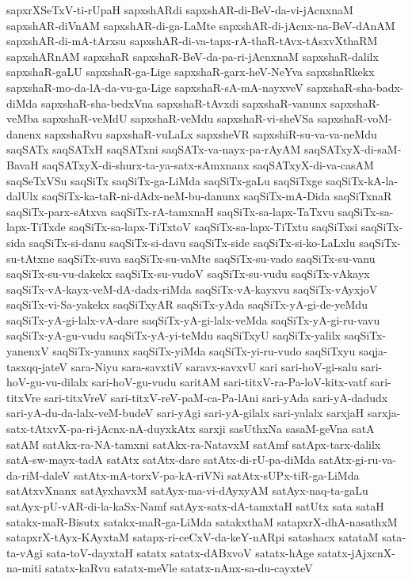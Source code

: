 {sapxrXSeTxV-ti-rUpaH
sapxshARdi
sapxshAR-di-BeV-da-vi-jAcnxnaM
sapxshAR-diVnAM
sapxshAR-di-ga-LaMte
sapxshAR-di-jAcnx-na-BeV-dAnAM
sapxshAR-di-mA-tArxsu
sapxshAR-di-va-tapx-rA-thaR-tAvx-tAsxvXthaRM
sapxshARnAM
sapxshaR
sapxshaR-BeV-da-pa-ri-jAcnxnaM
sapxshaR-dalilx
sapxshaR-gaLU
sapxshaR-ga-Lige
sapxshaR-garx-heV-NeYva
sapxshaRkekx
sapxshaR-mo-da-lA-da-vu-ga-Lige
sapxshaR-sA-mA-nayxveV
sapxshaR-sha-badx-diMda
sapxshaR-sha-bedxVna
sapxshaR-tAvxdi
sapxshaR-vanunx
sapxshaR-veMba
sapxshaR-veMdU
sapxshaR-veMdu
sapxshaR-vi-sheVSa
sapxshaR-voM-danenx
sapxshaRvu
sapxshaR-vuLaLx
sapxsheVR
sapxshiR-su-va-va-neMdu
saqSATx
saqSATxH
saqSATxni
saqSATx-va-nayx-pa-rAyAM
saqSATxyX-di-saM-BavaH
saqSATxyX-di-shurx-ta-ya-satx-sAmxnanx
saqSATxyX-di-va-casAM
saqSeTxVSu
saqSiTx
saqSiTx-ga-LiMda
saqSiTx-gaLu
saqSiTxge
saqSiTx-kA-la-dalUlx
saqSiTx-ka-taR-ni-dAdx-neM-bu-danunx
saqSiTx-mA-Dida
saqSiTxnaR
saqSiTx-parx-sAtxva
saqSiTx-rA-tamxnaH
saqSiTx-sa-lapx-TaTxvu
saqSiTx-sa-lapx-TiTxde
saqSiTx-sa-lapx-TiTxtoV
saqSiTx-sa-lapx-TiTxtu
saqSiTxsi
saqSiTx-sida
saqSiTx-si-danu
saqSiTx-si-davu
saqSiTx-side
saqSiTx-si-ko-LaLxlu
saqSiTx-su-tAtxne
saqSiTx-suva
saqSiTx-su-vaMte
saqSiTx-su-vado
saqSiTx-su-vanu
saqSiTx-su-vu-dakekx
saqSiTx-su-vudoV
saqSiTx-su-vudu
saqSiTx-vAkayx
saqSiTx-vA-kayx-veM-dA-dadx-riMda
saqSiTx-vA-kayxvu
saqSiTx-vAyxjoV
saqSiTx-vi-Sa-yakekx
saqSiTxyAR
saqSiTx-yAda
saqSiTx-yA-gi-de-yeMdu
saqSiTx-yA-gi-lalx-vA-dare
saqSiTx-yA-gi-lalx-veMda
saqSiTx-yA-gi-ru-vavu
saqSiTx-yA-gu-vudu
saqSiTx-yA-yi-teMdu
saqSiTxyU
saqSiTx-yalilx
saqSiTx-yanenxV
saqSiTx-yanunx
saqSiTx-yiMda
saqSiTx-yi-ru-vudo
saqSiTxyu
saqja-tasxqq-jateV
sara-Niyu
sara-savxtiV
saravx-savxvU
sari
sari-hoV-gi-salu
sari-hoV-gu-vu-dilalx
sari-hoV-gu-vudu
saritAM
sari-titxV-ra-Pa-loV-kitx-vatf
sari-titxVre
sari-titxVreV
sari-titxV-reV-paM-ca-Pa-lAni
sari-yAda
sari-yA-dadudx
sari-yA-du-da-lalx-veM-budeV
sari-yAgi
sari-yA-gilalx
sari-yalalx
sarxjaH
sarxja-satx-tAtxvX-pa-ri-jAcnx-nA-duyxkAtx
sarxji
sasUthxNa
sasaM-geVna
satA
satAM
satAkx-ra-NA-tamxni
satAkx-ra-NatavxM
satAmf
satApx-tarx-dalilx
satA-sw-mayx-tadA
satAtx
satAtx-dare
satAtx-di-rU-pa-diMda
satAtx-gi-ru-va-da-riM-daleV
satAtx-mA-torxV-pa-kA-riVNi
satAtx-sUPx-tiR-ga-LiMda
satAtxvXnanx
satAyxhavxM
satAyx-ma-vi-dAyxyAM
satAyx-naq-ta-gaLu
satAyx-pU-vAR-di-la-kaSx-Namf
satAyx-satx-dA-tamxtaH
satUtx
sata
sataH
satakx-maR-Bisutx
satakx-maR-ga-LiMda
satakxthaM
satapxrX-dhA-nasathxM
satapxrX-tAyx-KAyxtaM
satapx-ri-ceCxV-da-keY-nARpi
satashacx
satataM
sata-ta-vAgi
sata-toV-dayxtaH
satatx
satatx-dABxvoV
satatx-hAge
satatx-jAjxcnX-na-miti
satatx-kaRvu
satatx-meVle
satatx-nAnx-sa-du-cayxteV
}
